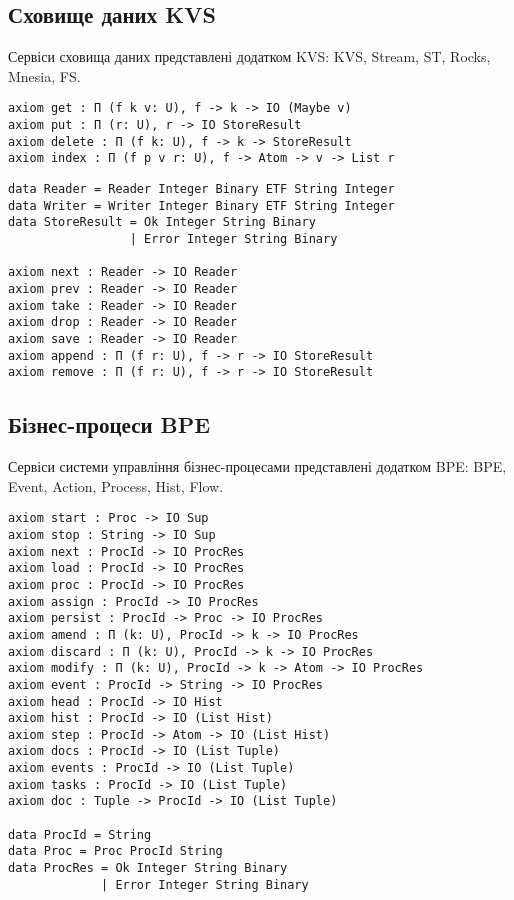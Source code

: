 \newpage
\subsection{Сховище даних KVS}
Сервіси сховища даних представлені додатком KVS: KVS,
Stream, ST, Rocks, Mnesia, FS.

\begin{lstlisting}
axiom get : Π (f k v: U), f -> k -> IO (Maybe v)
axiom put : Π (r: U), r -> IO StoreResult
axiom delete : Π (f k: U), f -> k -> StoreResult
axiom index : Π (f p v r: U), f -> Atom -> v -> List r
\end{lstlisting}

\begin{lstlisting}
data Reader = Reader Integer Binary ETF String Integer
data Writer = Writer Integer Binary ETF String Integer
data StoreResult = Ok Integer String Binary
                 | Error Integer String Binary

axiom next : Reader -> IO Reader
axiom prev : Reader -> IO Reader
axiom take : Reader -> IO Reader
axiom drop : Reader -> IO Reader
axiom save : Reader -> IO Reader
axiom append : Π (f r: U), f -> r -> IO StoreResult
axiom remove : Π (f r: U), f -> r -> IO StoreResult
\end{lstlisting}

\subsection{Бізнес-процеси BPE}
Сервіси системи управління бізнес-процесами
представлені додатком BPE: BPE, Event, Action, Process, Hist, Flow.

\begin{lstlisting}
axiom start : Proc -> IO Sup
axiom stop : String -> IO Sup
axiom next : ProcId -> IO ProcRes
axiom load : ProcId -> IO ProcRes
axiom proc : ProcId -> IO ProcRes
axiom assign : ProcId -> IO ProcRes
axiom persist : ProcId -> Proc -> IO ProcRes
axiom amend : Π (k: U), ProcId -> k -> IO ProcRes
axiom discard : Π (k: U), ProcId -> k -> IO ProcRes
axiom modify : Π (k: U), ProcId -> k -> Atom -> IO ProcRes
axiom event : ProcId -> String -> IO ProcRes
axiom head : ProcId -> IO Hist
axiom hist : ProcId -> IO (List Hist)
axiom step : ProcId -> Atom -> IO (List Hist)
axiom docs : ProcId -> IO (List Tuple)
axiom events : ProcId -> IO (List Tuple)
axiom tasks : ProcId -> IO (List Tuple)
axiom doc : Tuple -> ProcId -> IO (List Tuple)

data ProcId = String
data Proc = Proc ProcId String
data ProcRes = Ok Integer String Binary
             | Error Integer String Binary

\end{lstlisting}

